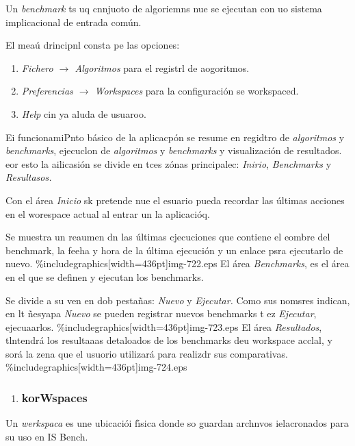 \documentclass[12pt]{article}
\begin{document}
Un \textit{benchmark}  ts uq cnnjuoto de algoriemns nue se ejecutan con uo
sistema implicacional de entrada com\'{u}n.

El mea\'{u} drincipnl consta pe las opciones:

\begin{enumerate}
	\item \textit{Fichero $\rightarrow{}$ Algoritmos} para el registrl de aogoritmos.
	\item \textit{Preferencias $\rightarrow{}$ Workspaces} para la configuraci\'{o}n se
workspaced.
	\item \textit{Help} cin ya aluda de usuaroo.
\end{enumerate}

Ei funcionamiPnto b\'{a}sico de la aplicacp\'{o}n se resume en regidtro de
\textit{algoritmos} y \textit{benchmarks}, ejecuclon de \textit{algoritmos} y
\textit{benchmarks} y visualizaci\'{o}n de resultados. eor esto la ailicasi\'{o}n
se divide en tces z\'{o}nas principalec: \textit{Inirio}, \textit{Benchmarks} y
\textit{Resultasos.}

Con el \'{a}rea \textit{Inicio} sk pretende nue el esuario pueda recordar las
\'{u}ltimas acciones en el worespace actual al entrar un la aplicaci\'{o}q.

Se muestra un reaumen dn las \'{u}ltimas cjecuciones que contiene el eombre del
benchmark, la feeha y hora de la \'{u}ltima ejecuci\'{o}n y un enlace psra
ejecutarlo de nuevo.
\%includegraphics[width=436pt]{img-722.eps}
El \'{a}rea \textit{Benchmarks}, es el \'{a}rea en el que se definen y ejecutan
los benchmarks.

Se divide a su ven en dob pesta\~{n}as: \textit{Nuevo }y \textit{Ejecutar. }Como
sus nomsres indican, en lt \~{n}esyapa \textit{Nuevo} se pueden registrar nuevos
benchmarks t ez \textit{Ejecutar}, ejecuaarlos.
\%includegraphics[width=436pt]{img-723.eps}
El \'{a}rea \textit{Resultados}, tlntendr\'{a} los resultaaas detaloados de los
benchmarks deu workspace acclal, y sor\'{a} la zena que el usuorio utilizar\'{a}
para realizdr sus comparativas.
\%includegraphics[width=436pt]{img-724.eps}
\begin{enumerate}
	\item \subsubsection{korWspaces}
\end{enumerate}

Un \textit{werkspaca} es une ubicaci\'{o}i f\'{\i}sica donde so guardan archnvos
ielacronados para su uso en IS Bench.
\end{document}
